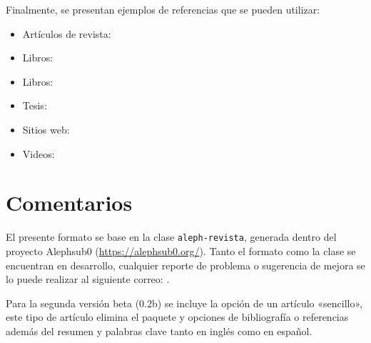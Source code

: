 \documentclass{aleph-revista}
\begin{document}
Finalmente, se presentan ejemplos de referencias que se pueden utilizar:
\begin{itemize}
    \item Artículos de revista: \cite{Bib01}
    \item Libros: \cite{Bib02}
    \item Libros: \cite{Bib06}
    \item Tesis: \cite{Bib03}
    \item Sitios web: \cite{Bib04}
    \item Videos: \cite{Bib05}
\end{itemize}

\section{Comentarios}

El presente formato se base en la clase \texttt{aleph-revista}, generada dentro del proyecto Alephsub0 (\url{https://alephsub0.org/}). Tanto el formato como la clase se encuentran en desarrollo, cualquier reporte de problema o sugerencia de mejora se lo puede realizar al siguiente correo: 
.

Para la segunda versión beta (0.2b) se incluye la opción de un artículo «sencillo», este tipo de artículo elimina el paquete y opciones de bibliografía o referencias además del resumen y palabras clave tanto en inglés como en español.
\printbibliography
\end{document}
